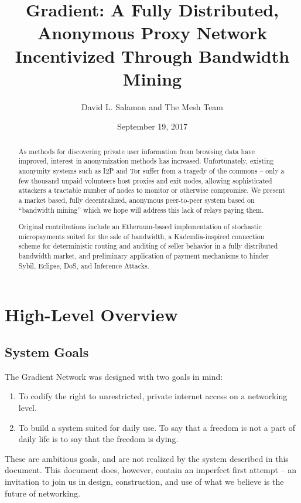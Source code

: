 \documentclass{article}
\title{Gradient: A Fully Distributed, Anonymous Proxy Network Incentivized Through Bandwidth Mining}
\author{David L. Salamon and The Mesh Team}
\date{September 19, 2017}
\begin{document}
\maketitle

\begin{abstract}
  As methods for discovering private user information from browsing data have improved, interest in anonymization methods has increased. Unfortunately, existing anonymity systems such as I2P and Tor suffer from a tragedy of the commons – only a few thousand unpaid volunteers host proxies and exit nodes, allowing sophisticated attackers a tractable number of nodes to monitor or otherwise compromise. We present a market based, fully decentralized, anonymous peer-to-peer system based on “bandwidth mining” which we hope will address this lack of relays paying them.

  Original contributions include an Etheruum-based implementation of stochastic micropayments suited for the sale of bandwidth, a Kademlia-inspired connection scheme for deterministic routing and auditing of seller behavior in a fully distributed bandwidth market, and preliminary application of payment mechanisms to hinder Sybil, Eclipse, DoS, and Inference Attacks.
\end{abstract}


\tableofcontents
\newpage


\section{High-Level Overview}
\label{sec:overview}

\subsection{System Goals}

The Gradient Network was designed with two goals in mind:

\begin{enumerate}
    \item To codify the right to unrestricted, private internet access on a networking level.
    \item To build a system suited for daily use. To say that a freedom is not a part of daily life is to say that the freedom is dying.
\end{enumerate}

These are ambitious goals, and are not realized by the system described in this document. This document does, however, contain an imperfect first attempt – an invitation to join us in design, construction, and use of what we believe is the future of networking.
\end{document}
